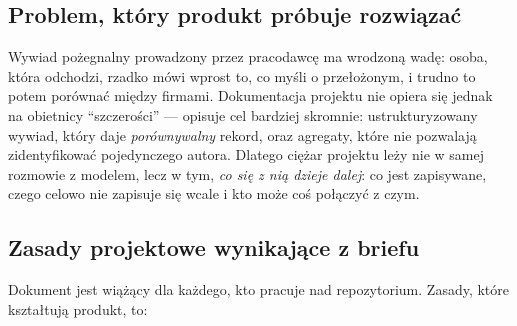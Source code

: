 \subsection{Problem, który produkt próbuje rozwiązać}

Wywiad pożegnalny prowadzony przez pracodawcę ma wrodzoną wadę: osoba, która
odchodzi, rzadko mówi wprost to, co myśli o przełożonym, i trudno to potem
porównać między firmami. Dokumentacja projektu nie opiera się jednak na
obietnicy ``szczerości'' --- opisuje cel bardziej skromnie: ustrukturyzowany
wywiad, który daje \emph{porównywalny} rekord, oraz agregaty, które nie
pozwalają zidentyfikować pojedynczego autora. Dlatego ciężar projektu leży
nie w samej rozmowie z modelem, lecz w tym, \emph{co się z nią dzieje dalej}:
co jest zapisywane, czego celowo nie zapisuje się wcale i kto może coś
połączyć z czym.

\subsection{Zasady projektowe wynikające z briefu}

Dokument  jest wiążący dla każdego,
kto pracuje nad repozytorium. Zasady, które kształtują produkt, to:

